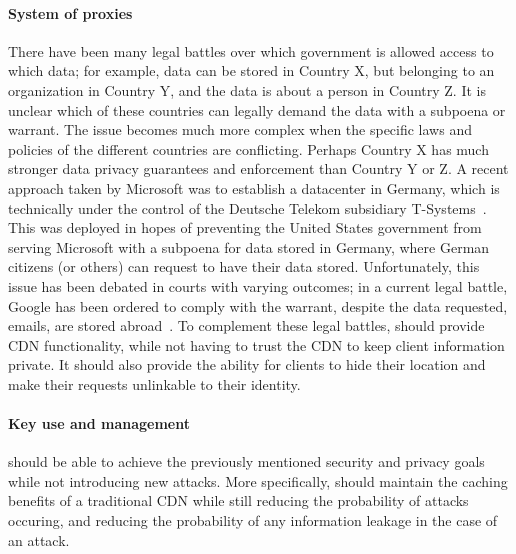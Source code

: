 \paragraph{System of proxies} There have been many legal battles over which government is allowed access 
to which data; for example, data can be stored in Country X, but belonging to an organization in Country Y, and 
the data is about a person in Country Z.  It is unclear which of these countries can legally demand 
the data with a subpoena or warrant.  The issue becomes much more complex when the specific laws 
and policies of the different countries are conflicting.  Perhaps Country X has much stronger data privacy 
guarantees and enforcement than Country Y or Z.  A recent approach taken by Microsoft was to establish 
a datacenter in Germany, which is technically under the control of the Deutsche Telekom subsidiary 
T-Systems~\cite{microsoft_germany}.  This was deployed in hopes of preventing the United States government from serving Microsoft with a subpoena 
for data stored in Germany, where German citizens (or others) can request to have their data stored.  Unfortunately, this issue has 
been debated in courts with varying outcomes; in a current legal battle, Google 
has been ordered to comply with the warrant, despite the data requested, emails, are stored abroad~\cite{google_warrant}.
  To complement these legal battles, \system{} should provide CDN functionality, while not having to trust 
the CDN to keep client information private.  It should also provide the ability for clients 
to hide their location and make their requests unlinkable to their identity.

\paragraph{Key use and management} \system{} should be able to achieve the previously mentioned security 
and privacy goals while not introducing new attacks.  More specifically, \system{} should maintain the 
caching benefits of a traditional CDN while still reducing 
the probability of attacks occuring, and reducing the probability of any information leakage in 
the case of an attack.


